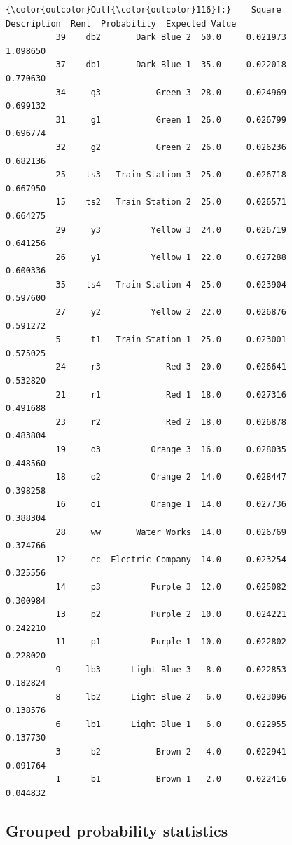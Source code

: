 \documentclass[11pt]{article}
\begin{document}
\begin{Verbatim}[commandchars=\\\{\}]
{\color{outcolor}Out[{\color{outcolor}116}]:}    Square       Description  Rent  Probability  Expected Value
          39    db2       Dark Blue 2  50.0     0.021973        1.098650
          37    db1       Dark Blue 1  35.0     0.022018        0.770630
          34     g3           Green 3  28.0     0.024969        0.699132
          31     g1           Green 1  26.0     0.026799        0.696774
          32     g2           Green 2  26.0     0.026236        0.682136
          25    ts3   Train Station 3  25.0     0.026718        0.667950
          15    ts2   Train Station 2  25.0     0.026571        0.664275
          29     y3          Yellow 3  24.0     0.026719        0.641256
          26     y1          Yellow 1  22.0     0.027288        0.600336
          35    ts4   Train Station 4  25.0     0.023904        0.597600
          27     y2          Yellow 2  22.0     0.026876        0.591272
          5      t1   Train Station 1  25.0     0.023001        0.575025
          24     r3             Red 3  20.0     0.026641        0.532820
          21     r1             Red 1  18.0     0.027316        0.491688
          23     r2             Red 2  18.0     0.026878        0.483804
          19     o3          Orange 3  16.0     0.028035        0.448560
          18     o2          Orange 2  14.0     0.028447        0.398258
          16     o1          Orange 1  14.0     0.027736        0.388304
          28     ww       Water Works  14.0     0.026769        0.374766
          12     ec  Electric Company  14.0     0.023254        0.325556
          14     p3          Purple 3  12.0     0.025082        0.300984
          13     p2          Purple 2  10.0     0.024221        0.242210
          11     p1          Purple 1  10.0     0.022802        0.228020
          9     lb3      Light Blue 3   8.0     0.022853        0.182824
          8     lb2      Light Blue 2   6.0     0.023096        0.138576
          6     lb1      Light Blue 1   6.0     0.022955        0.137730
          3      b2           Brown 2   4.0     0.022941        0.091764
          1      b1           Brown 1   2.0     0.022416        0.044832
\end{Verbatim}
            
    \hypertarget{grouped-probability-statistics}{%
\subsection{Grouped probability
statistics}\label{grouped-probability-statistics}}
\end{document}
